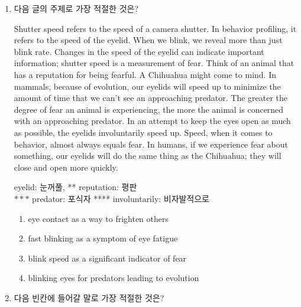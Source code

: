\documentclass[9pt, a4paper, twocolumn]{oblivoir}
\begin{document}
\begin{enumerate}
\pagebreak
    \item 다음 글의 주제로 가장 적절한 것은?

    Shutter speed refers to the speed of a camera shutter. In
behavior profiling, it refers to the speed of the eyelid. When we
blink, we reveal more than just blink rate. Changes in the speed
of the eyelid can indicate important information; shutter speed
is a measurement of fear. Think of an animal that has a
reputation for being fearful. A Chihuahua might come to mind.
In mammals, because of evolution, our eyelids will speed up to
minimize the amount of time that we can’t see an approaching
predator. The greater the degree of fear an animal is
experiencing, the more the animal is concerned with an
approaching predator. In an attempt to keep the eyes open as
much as possible, the eyelids involuntarily speed up. Speed,
when it comes to behavior, almost always equals fear. In
humans, if we experience fear about something, our eyelids will
do the same thing as the Chihuahua; they will close and open
more quickly.
\begin{flushright}
    {\small * eyelid: 눈꺼풀, ** reputation: 평판\\ $***$ predator: 포식자 **** involuntarily: 비자발적으로}
\end{flushright}
    \begin{enumerate}
        \item eye contact as a way to frighten others
        \item fast blinking as a symptom of eye fatigue
        \item blink speed as a significant indicator of fear %
        \item blinking eyes for predators leading to evolution  
    \end{enumerate}


\pagebreak
        \item 다음 빈칸에 들어갈 말로 가장 적절한 것은?


\end{enumerate}
\end{document}
